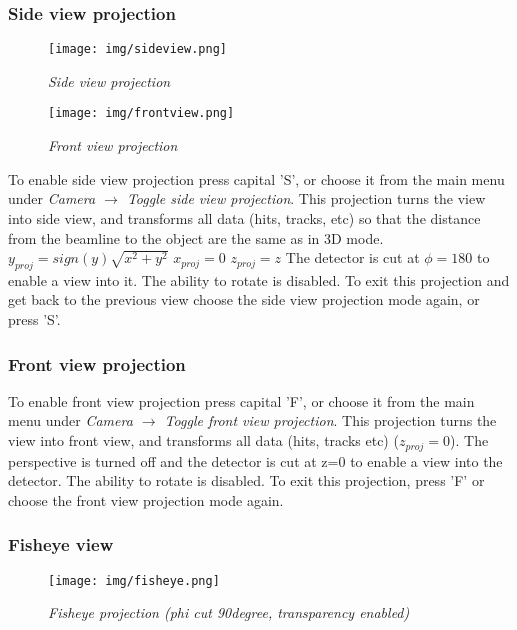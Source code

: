\documentclass[a4paper,10pt]{article}
\begin{document}
\subsubsection{Side view projection}
\begin{figure}
\begin{minipage}[t]{6cm}
\centerline{\texttt{[image: img/sideview.png]}}
\caption{\label{CEDViewer} \textsl{Side view projection}}
\end{minipage}
\hfill
\begin{minipage}[t]{6cm}
\setlength{\fboxsep}{0mm}
\centerline{\texttt{[image: img/frontview.png]}}
\caption{\label{DSTViewer}\textsl{Front view projection}}
\end{minipage}
\end{figure}


To enable side view projection press capital 'S', or choose it from the main menu under \textit{Camera $\to$ Toggle side view projection}. 
This projection turns the view into side view, and transforms all data (hits, tracks, etc) so that the distance from the beamline to the object are the same as in 3D mode.
\newline\newline
$y_{proj} = sign(y) \sqrt{x^2 + y^2}$\newline
$x_{proj}=0$\newline
$z_{proj} = z$ \newline
\newline
The detector is cut at $\phi=180$ to enable a view into it. The ability to rotate is  disabled. 
To exit this projection and get back to the previous view choose the side view projection mode again, or press 'S'. 




\subsubsection{Front view projection}
To enable front view projection press capital 'F', or choose it from the main menu under 
\textit{Camera $\to$ Toggle front view projection}.
This projection turns the view into front view, and transforms all data (hits, tracks etc)
($z_{proj} = 0$). The perspective is turned off and the detector is cut at z=0 to enable a view into the detector. The ability to rotate is disabled. To exit this projection, press 'F' or choose the front view projection mode again. 


\subsubsection{Fisheye view}
\begin{figure}
\centerline{ \texttt{[image: img/fisheye.png]}}
\caption{\label{CEDViewer} \textsl{Fisheye projection (phi cut 90degree, transparency enabled)}}
\end{figure}
\end{document}
